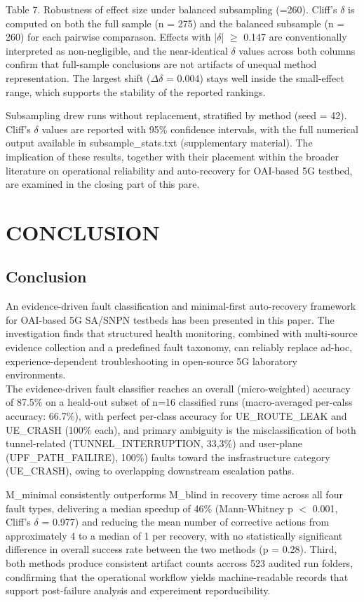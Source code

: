 \documentclass[conference]{IEEEtran}
\begin{document}
Table 7. Robustness of effect size under balanced subsampling (=260). Cliff's $\delta$ is computed on both the full sample (n = 275) and the balanced subsample (n = 260) for each pairwise comparason. Effects with |$\delta$| $\geq$ 0.147 are conventionally interpreted as non-negligible, and the near-identical $\delta$ values across both columns confirm that full-sample conclusions are not artifacts of unequal method representation. The largest shift ($\Delta$$\delta$ = 0.004) stays well inside the small-effect range, which supports the stability of the reported rankings.

Subsampling drew runs without replacement, stratified by method (seed = 42). Cliff's $\delta$ values are reported with 95\% confidence intervals, with the full numerical output available in subsample\_stats.txt (supplementary material).
The implication of these results, together with their placement within the broader literature on operational reliability and auto-recovery for OAI-based 5G testbed, are examined in the closing part of this pare.

\section{CONCLUSION}
\subsection{Conclusion}
An evidence-driven fault classification and minimal-first auto-recovery framework for OAI-based 5G SA/SNPN testbeds has been presented in this paper. The investigation finds that structured health monitoring, combined with multi-source evidence collection and a predefined fault taxonomy, can reliably replace ad-hoc, experience-dependent troubleshooting in open-source 5G laboratory environments.\\

The evidence-driven fault classifier reaches an overall (micro-weighted) accuracy of 87.5\% on a heald-out subset of n=16 classified runs (macro-averaged per-calss accuracy: 66.7\%), with perfect per-class accuracy for UE\_ROUTE\_LEAK and UE\_CRASH (100\% each), and primary ambiguity is the misclassification of both tunnel-related (TUNNEL\_INTERRUPTION, 33,3\%) and user-plane (UPF\_PATH\_FAILIRE), 100\%) faults toward the insfrastructure category (UE\_CRASH), owing to overlapping downstream escalation paths.

M\_minimal consistently outperforms M\_blind in recovery time across all four fault types, delivering a median speedup of 46\% (Mann-Whitney p $<$ 0.001, Cliff's $\delta$ = 0.977) and reducing the mean number of corrective actions from approximately 4 to a median of 1 per recovery, with no statistically significant difference in overall success rate between the two methods (p = 0.28). Third, both methods produce consistent artifact counts accross 523 audited run folders, condfirming that the operational workflow yields machine-readable records that support post-failure analysis and expereiment reporducibility.
\end{document}
